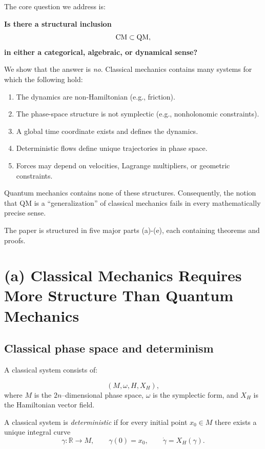 \documentclass[12pt]{article}
\begin{document}
The core question we address is:

\medskip
\noindent\textbf{Is there a structural inclusion}
\[
  {\rm CM} \subset {\rm QM},
\]
\noindent\textbf{in either a categorical, algebraic, or dynamical sense?}

We show that the answer is \emph{no}.  
Classical mechanics contains many systems for which the following hold:

\begin{enumerate}
\item The dynamics are non-Hamiltonian (e.g., friction).
\item The phase-space structure is not symplectic (e.g., nonholonomic constraints).
\item A global time coordinate exists and defines the dynamics.
\item Deterministic flows define unique trajectories in phase space.
\item Forces may depend on velocities, Lagrange multipliers, or geometric constraints.
\end{enumerate}

Quantum mechanics contains none of these structures.  
Consequently, the notion that QM is a ``generalization'' of classical mechanics fails in every mathematically precise sense.

The paper is structured in five major parts (a)-(e), each containing theorems and proofs.


\section{(a) Classical Mechanics Requires More Structure Than Quantum Mechanics}
\subsection{Classical phase space and determinism}

A classical system consists of:

\[
(M, \omega, H, X_H),
\]
where $M$ is the $2n$--dimensional phase space, $\omega$ is the symplectic form, and $X_H$ is the Hamiltonian vector field.

\begin{definition}
A classical system is \emph{deterministic} if for every initial point $x_0\in M$ there exists a unique integral curve
\[
\gamma: \mathbb{R}\to M,\qquad \gamma(0)=x_0,\qquad \dot\gamma=X_H(\gamma).
\]
\end{definition}
\end{document}
